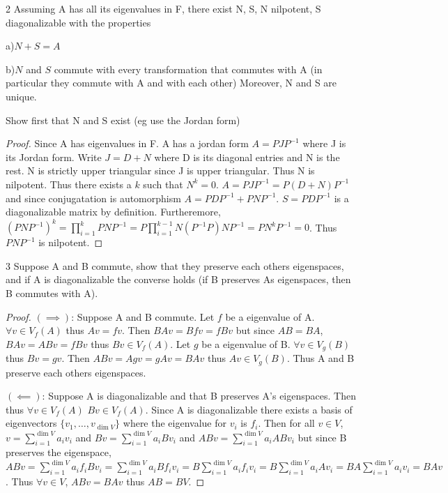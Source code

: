 \documentclass{article}
\begin{document}
\bigskip

\begin{PROB}{2}\label{Problem 2.}
    Assuming A has all its eigenvalues in F, there exist N, S, N nilpotent, S diagonalizable with the properties 
    
    a)$ N + S = A$
    
    b)$ N$ and $S$ commute with every transformation that commutes with A (in particular they commute with A and with each other) Moreover, N and S are unique.
    
    Show first that N and S exist (eg use the Jordan form)
\end{PROB}
\begin{proof}
    Since A has eigenvalues in F. A has a jordan form $A = PJP^{-1}$ where J is its Jordan form. Write $J = D + N$ where D is its diagonal entries and N is the rest. N is strictly upper triangular since J is upper triangular. Thus N is nilpotent. Thus there exists a $k$ such that $N^k = 0$. $A = PJP^{-1} = P(D + N)P^{-1}$ and since conjugatation is automorphism $A = PDP^{-1} + PNP^{-1}$. $S = PDP^{-1}$ is a diagonalizable matrix by definition. Furtheremore, $(PNP^{-1})^k = \prod_{i = 1}^{k}PNP^{-1} = P\prod_{i = 1}^{k - 1}N(P^{-1}P) NP^{-1} = PN^kP^{-1} = 0$. Thus $PNP^{-1}$ is nilpotent.
\end{proof}

\bigskip

\begin{PROB}{3}\label{Problem 3.}
    Suppose A and B commute, show that they preserve each others eigenspaces, and if A is diagonalizable the converse holds (if B preserves As eigenspaces, then B commutes with A).
\end{PROB}
\begin{proof}
    $(\implies)$: Suppose A and B commute. Let $f$ be a eigenvalue of A. $\forall v \in V_f(A)$ thus $Av = fv$. Then $BAv = Bfv = fBv$ but since $AB = BA$, $BAv = ABv = fBv$ thus $Bv \in V_f(A)$. Let $g$ be a eigenvalue of B. $\forall v \in V_g(B)$ thus $Bv = gv$. Then $ABv = Agv = gAv = BAv$ thus $Av \in V_g(B)$. Thus A and B preserve each others eigenspaces.

    $(\impliedby)$: Suppose A is diagonalizable and that B preserves A's eigenspaces. Then thus $\forall v \in V_f(A)$ $Bv \in V_f(A)$. Since A is diagonalizable there exists a basis of eigenvectors $\{v_1, \ldots, v_{\dim V}\}$ where the eigenvalue for $v_i$ is $f_i$. Then for all $v \in V$, $v = \sum_{i = 1}^{\dim V}a_iv_i$ and $Bv = \sum_{i = 1}^{\dim V}a_iBv_i$ and $ABv = \sum_{i = 1}^{\dim V}a_iABv_i$ but since B preserves the eigenspace, $ABv = \sum_{i = 1}^{\dim V}a_if_iBv_i = \sum_{i = 1}^{\dim V}a_iBf_iv_i = B\sum_{i = 1}^{\dim V}a_if_iv_i = B\sum_{i = 1}^{\dim V}a_iAv_i = BA\sum_{i = 1}^{\dim V}a_iv_i = BAv$. Thus $\forall v \in V$, $ABv = BAv$ thus $AB = BV$.
\end{proof}
\end{document}
